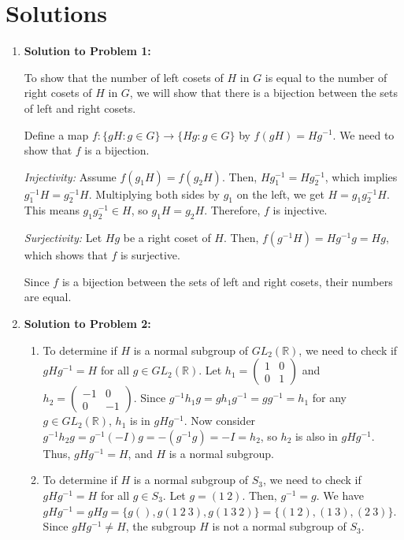 \section{Solutions}

\begin{enumerate}
  \item \textbf{Solution to Problem 1:}

  To show that the number of left cosets of $H$ in $G$ is equal to the number of right cosets of $H$ in $G$, we will show that there is a bijection between the sets of left and right cosets.

  Define a map $f: \{gH : g \in G\} \to \{Hg : g \in G\}$ by $f(gH) = Hg^{-1}$. We need to show that $f$ is a bijection.

  \textit{Injectivity:} Assume $f(g_1H) = f(g_2H)$. Then, $Hg_1^{-1} = Hg_2^{-1}$, which implies $g_1^{-1}H = g_2^{-1}H$. Multiplying both sides by $g_1$ on the left, we get $H = g_1g_2^{-1}H$. This means $g_1g_2^{-1} \in H$, so $g_1H = g_2H$. Therefore, $f$ is injective.

  \textit{Surjectivity:} Let $Hg$ be a right coset of $H$. Then, $f(g^{-1}H) = Hg^{-1}g = Hg$, which shows that $f$ is surjective.

  Since $f$ is a bijection between the sets of left and right cosets, their numbers are equal.

  \item \textbf{Solution to Problem 2:}
    \begin{enumerate}
      \item To determine if $H$ is a normal subgroup of $GL_2(\mathbb{R})$, we need to check if $gHg^{-1} = H$ for all $g \in GL_2(\mathbb{R})$. Let $h_1 = \begin{pmatrix} 1 & 0 \\ 0 & 1 \end{pmatrix}$ and $h_2 = \begin{pmatrix} -1 & 0 \\ 0 & -1 \end{pmatrix}$. Since $g^{-1}h_1g = gh_1g^{-1} = gg^{-1} = h_1$ for any $g \in GL_2(\mathbb{R})$, $h_1$ is in $gHg^{-1}$. Now consider $g^{-1}h_2g = g^{-1}(-I)g = -(g^{-1}g) = -I = h_2$, so $h_2$ is also in $gHg^{-1}$. Thus, $gHg^{-1} = H$, and $H$ is a normal subgroup.

      \item To determine if $H$ is a normal subgroup of $S_3$, we need to check if $gHg^{-1} = H$ for all $g \in S_3$. Let $g = (1\ 2)$. Then, $g^{-1} = g$. We have $gHg^{-1} = gHg = \{g(), g(1\ 2\ 3), g(1\ 3\ 2)\} = \{(1\ 2), (1\ 3), (2\ 3)\}$. Since $gHg^{-1} \neq H$, the subgroup $H$ is not a normal subgroup of $S_3$.
    \end{enumerate}


\end{enumerate}
